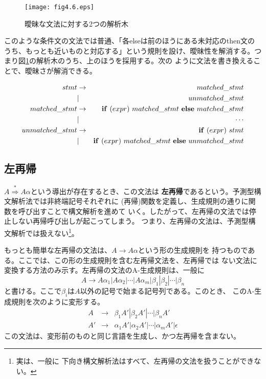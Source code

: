 \documentclass[a4j,11pt]{jsarticle}
\begin{document}
\begin{figure}[]
 \begin{center}
  \texttt{[image: fig4.6.eps]}
 \end{center}
 \caption{曖昧な文法に対する2つの解析木}
 \label{fig:ambiguous_grammar}
\end{figure}

このような条件文の文法では普通、「各elseは前のほうにある未対応のthen文の
うち、もっとも近いものと対応する」という規則を設け、曖昧性を解消する。つ
まり図\ref{fig:ambiguous_grammar}の解析木のうち、上のほうを採用する。次の
ように文法を書き換えることで、曖昧さが解消できる。

\begin{eqnarray*}
 stmt & \rightarrow & matched\_stmt \\
      & |           & unmatched\_stmt \\
 matched\_stmt & \rightarrow & {\bf if}\ (expr)\ matched\_stmt\ {\bf
  else}\ matched\_stmt \\
      & |           & \cdots \\
 unmatched\_stmt & \rightarrow & {\bf if}\ (expr)\ stmt \\
                 & |           & {\bf if}\ (expr)\ matched\_stmt\ {\bf
		  else}\ unmatched\_stmt
\end{eqnarray*}

\subsection{左再帰}

$A \stackrel{*}{\Rightarrow} A\alpha$という導出が存在するとき、この文法は
{\bfseries 左再帰}であるという。予測型構文解析法では非終端記号それぞれに
(再帰)関数を定義し、生成規則の通りに関数を呼び出すことで構文解析を進めて
いく。したがって、左再帰の文法では停止しない再帰呼び出しが起こってしまう。
つまり、左再帰の文法は、予測型構文解析では扱えない\footnote{実は、一般に
下向き構文解析法はすべて、左再帰の文法を扱うことができない。}。

もっとも簡単な左再帰の文法は、$A \rightarrow A\alpha$という形の生成規則を
持つものである。ここでは、この形の生成規則を含む左再帰文法を、左再帰では
ない文法に変換する方法のみ示す。左再帰の文法のA-生成規則は、一般に
\[
 A \rightarrow A\alpha_1 | A\alpha_2 | \cdots | A\alpha_m | \beta_1 |
 \beta_2 | \cdots | \beta_n
\]
と書ける。ここで$\beta_i$は$A$以外の記号で始まる記号列である。このとき、
このA-生成規則を次のように変形する。
\begin{eqnarray*}
 A & \rightarrow & \beta_1 A' | \beta_2 A' | \cdots | \beta_n A' \\
 A' & \rightarrow & \alpha_1 A' | \alpha_2 A' | \cdots | \alpha_m A' | \epsilon
\end{eqnarray*}
この文法は、変形前のものと同じ言語を生成し、かつ左再帰を含まない。
\end{document}
